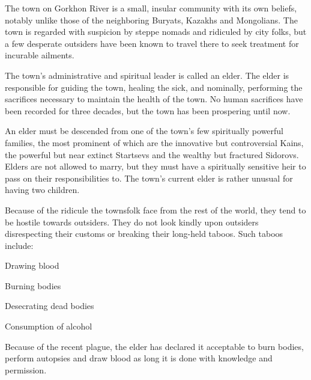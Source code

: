 \documentclass[blue]{Pestilence}
\begin{document}
\name{\bTownElders{}}

The town on Gorkhon River is a small, insular community with its own beliefs, notably unlike those of the neighboring Buryats, Kazakhs and Mongolians. The town is regarded with suspicion by steppe nomads and ridiculed by city folks, but a few desperate outsiders have been known to travel there to seek treatment for incurable ailments.

The town's administrative and spiritual leader is called an elder. The elder is responsible for guiding the town, healing the sick, and nominally, performing the sacrifices necessary to maintain the health of the town. No human sacrifices have been recorded for three decades, but the town has been prospering until now.

An elder must be descended from one of the town's few spiritually powerful families, the most prominent of which are the innovative but controversial Kains, the powerful but near extinct Startsevs and the wealthy but fractured Sidorovs. Elders are not allowed to marry, but they must have a spiritually sensitive heir to pass on their responsibilities to. The town's current elder is rather unusual for having two children.

Because of the ridicule the townsfolk face from the rest of the world, they tend to be hostile towards outsiders. They do not look kindly upon outsiders disrespecting their customs or breaking their long-held taboos. Such taboos include:

\begin{itemz}
	\item Drawing blood
	\item Burning bodies
	\item Desecrating dead bodies
	\item Consumption of alcohol
\end{itemz}

Because of the recent plague, the elder has declared it acceptable to burn bodies, perform autopsies and draw blood as long it is done with \cElder{\their} knowledge and permission. 
\end{document}
